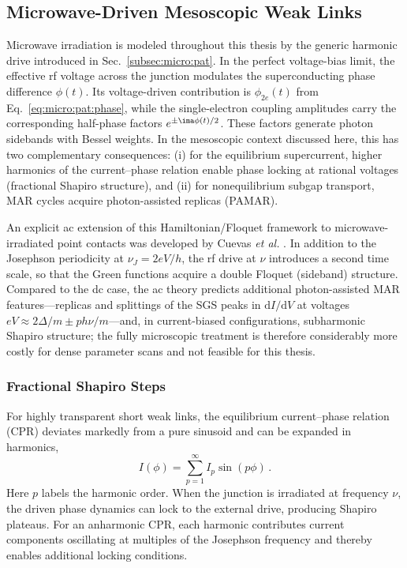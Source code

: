 
    \subsection{Microwave-Driven Mesoscopic Weak Links}

        Microwave irradiation is modeled throughout this thesis by the generic harmonic drive introduced in Sec.~\ref{subsec:micro:pat}. In the perfect voltage-bias limit, the effective rf voltage across the junction modulates the superconducting phase difference $\phi(t)$. Its voltage-driven contribution is $\phi_{2e}(t)$ from Eq.~\eqref{eq:micro:pat:phase}, while the single-electron coupling amplitudes carry the corresponding half-phase factors $e^{\pm \ima\phi(t)/2}$. These factors generate photon sidebands with Bessel weights. In the mesoscopic context discussed here, this has two complementary consequences: (i) for the equilibrium supercurrent, higher harmonics of the current--phase relation enable phase locking at rational voltages (fractional Shapiro structure), and (ii) for nonequilibrium subgap transport, MAR cycles acquire photon-assisted replicas (PAMAR).

        An explicit ac extension of this Hamiltonian/Floquet framework to microwave-irradiated point contacts was developed by Cuevas \textit{et al.} \cite{cuevas_subharmonic_2002}. In addition to the Josephson periodicity at $\nu_J=2eV/h$, the rf drive at $\nu$ introduces a second time scale, so that the Green functions acquire a double Floquet (sideband) structure. Compared to the dc case, the ac theory predicts additional photon-assisted MAR features---replicas and splittings of the SGS peaks in $\mathrm dI/\mathrm dV$ at voltages $eV\approx 2\Delta/m \pm ph\nu/m$---and, in current-biased configurations, subharmonic Shapiro structure; the fully microscopic treatment is therefore considerably more costly for dense parameter scans and not feasible for this thesis.

        \subsubsection*{Fractional Shapiro Steps}

            For highly transparent short weak links, the equilibrium current--phase relation (CPR) deviates markedly from a pure sinusoid and can be expanded in harmonics,
            \begin{equation}
                I(\phi)=\sum_{p = 1}^\infty I_p\sin(p\phi)\,.
                \label{eq:meso:cpr-harmonics}
            \end{equation}
            Here $p$ labels the harmonic order. When the junction is irradiated at frequency $\nu$, the driven phase dynamics can lock to the external drive, producing Shapiro plateaus. For an anharmonic CPR, each harmonic contributes current components oscillating at multiples of the Josephson frequency and thereby enables additional locking conditions. 
            
